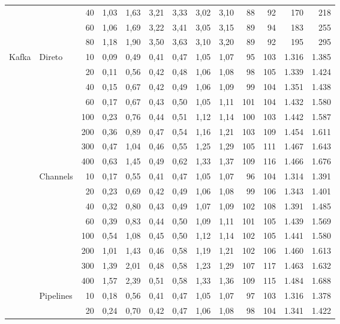 \begin{table}[p]
\begin{tabular}{|l|l|r|r|r|r|r|r|r|r|r|r|r|}
 &  & 40 & 1,03 & 1,63 & 3,21 & 3,33 & 3,02 & 3,10 & 88 & 92 & 170 & 218 \\
 &  & 60 & 1,06 & 1,69 & 3,22 & 3,41 & 3,05 & 3,15 & 89 & 94 & 183 & 255 \\
 &  & 80 & 1,18 & 1,90 & 3,50 & 3,63 & 3,10 & 3,20 & 89 & 92 & 195 & 295 \\
\hline
\multirow{24}{*}{Kafka} & \multirow{8}{*}{Direto} & 10 & 0,09 & 0,49 & 0,41 & 0,47 & 1,05 & 1,07 & 95 & 103 & 1.316 & 1.385 \\
 &  & 20 & 0,11 & 0,56 & 0,42 & 0,48 & 1,06 & 1,08 & 98 & 105 & 1.339 & 1.424 \\
 &  & 40 & 0,15 & 0,67 & 0,42 & 0,49 & 1,06 & 1,09 & 99 & 104 & 1.351 & 1.438 \\
 &  & 60 & 0,17 & 0,67 & 0,43 & 0,50 & 1,05 & 1,11 & 101 & 104 & 1.432 & 1.580 \\
 &  & 100 & 0,23 & 0,76 & 0,44 & 0,51 & 1,12 & 1,14 & 100 & 103 & 1.442 & 1.587 \\
 &  & 200 & 0,36 & 0,89 & 0,47 & 0,54 & 1,16 & 1,21 & 103 & 109 & 1.454 & 1.611 \\
 &  & 300 & 0,47 & 1,04 & 0,46 & 0,55 & 1,25 & 1,29 & 105 & 111 & 1.467 & 1.643 \\
 &  & 400 & 0,63 & 1,45 & 0,49 & 0,62 & 1,33 & 1,37 & 109 & 116 & 1.466 & 1.676 \\
\cline{2-13}
 & \multirow{8}{*}{Channels} & 10 & 0,17 & 0,55 & 0,41 & 0,47 & 1,05 & 1,07 & 96 & 104 & 1.314 & 1.391 \\
 &  & 20 & 0,23 & 0,69 & 0,42 & 0,49 & 1,06 & 1,08 & 99 & 106 & 1.343 & 1.401 \\
 &  & 40 & 0,32 & 0,80 & 0,43 & 0,49 & 1,07 & 1,09 & 102 & 108 & 1.391 & 1.485 \\
 &  & 60 & 0,39 & 0,83 & 0,44 & 0,50 & 1,09 & 1,11 & 101 & 105 & 1.439 & 1.569 \\
 &  & 100 & 0,54 & 1,08 & 0,45 & 0,50 & 1,12 & 1,14 & 102 & 105 & 1.441 & 1.580 \\
 &  & 200 & 1,01 & 1,43 & 0,46 & 0,58 & 1,19 & 1,21 & 102 & 106 & 1.460 & 1.613 \\
 &  & 300 & 1,39 & 2,01 & 0,48 & 0,58 & 1,23 & 1,29 & 107 & 117 & 1.463 & 1.632 \\
 &  & 400 & 1,57 & 2,39 & 0,51 & 0,58 & 1,33 & 1,36 & 109 & 115 & 1.484 & 1.688 \\
\cline{2-13}
 & \multirow{8}{*}{Pipelines} & 10 & 0,18 & 0,56 & 0,41 & 0,47 & 1,05 & 1,07 & 97 & 103 & 1.316 & 1.378 \\
 &  & 20 & 0,24 & 0,70 & 0,42 & 0,47 & 1,06 & 1,08 & 98 & 104 & 1.341 & 1.422 \\

\end{tabular}
\end{table}
